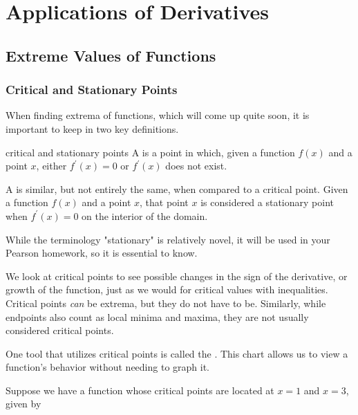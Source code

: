 \chapter{Applications of Derivatives}

\section{Extreme Values of Functions}

\subsection{Critical and Stationary Points}

When finding extrema of functions, which will come up quite soon, it is important to keep in two key definitions.

\begin{definition}{critical and stationary points}
    A  is a point in which, given a function \( f \left( x \right) \) and a point \( x \), either \( f^\prime \left( x \right) = 0 \) or \( f^\prime \left( x \right) \) does not exist.
    
    \vspace{0.3cm}
    
    A  is similar, but not entirely the same, when compared to a critical point. Given a function \( f \left( x \right) \) and a point \( x \), that point \( x \) is considered a stationary point when \( f^\prime \left( x \right) = 0 \) on the interior of the domain.
\end{definition}

While the terminology "stationary" is relatively novel, it will be used in your Pearson homework, so it is essential to know.

We look at critical points to see possible changes in the sign of the derivative, or growth of the function, just as we would for critical values with inequalities. Critical points \textit{can} be extrema, but they do not have to be. Similarly, while endpoints also count as local minima and maxima, they are not usually considered critical points.

One tool that utilizes critical points is called the . This chart allows us to view a function's behavior without needing to graph it.

Suppose we have a function whose critical points are located at \( x = 1 \) and \( x = 3 \), given by
    

